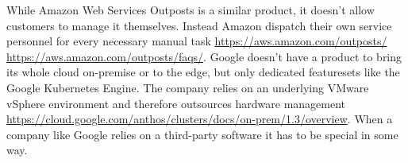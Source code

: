 \newline
While Amazon Web Services Outposts is a similar product, it doesn't allow customers to manage it themselves. Instead Amazon dispatch their own service personnel for every necessary manual task \url{https://aws.amazon.com/outposts/} \url{https://aws.amazon.com/outposts/faqs/}.
\newline
Google doesn't have a product to bring its whole cloud on-premise or to the edge, but only dedicated featuresets like the Google Kubernetes Engine. The company relies on an underlying VMware vSphere environment and therefore outsources hardware management \url{https://cloud.google.com/anthos/clusters/docs/on-prem/1.3/overview}.
\newline
When a company like Google relies on a third-party software it has to be special in some way.


